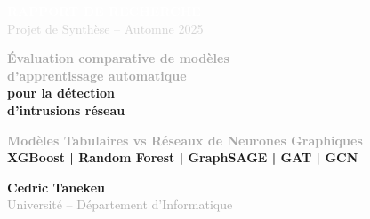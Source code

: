 ﻿\documentclass[11pt,a4paper]{article}
\begin{document}
\onehalfspacing

\begin{titlepage}
\begin{tcolorbox}[
    enhanced,
    colback=white,
    colframe=mainblue,
    boxrule=3pt,
    arc=0mm,
    left=0pt,
    right=0pt,
    top=0pt,
    bottom=0pt,
    height=\textheight,
    valign=center
]

\begin{tcolorbox}[
    colback=mainblue,
    colframe=mainblue,
    arc=0mm,
    boxrule=0pt,
    height=4cm,
    valign=center
]
\begin{center}
    \textcolor{white}{\Large\textbf{RAPPORT DE RECHERCHE}}\\[0.3cm]
    \textcolor{lightgray}{\large Projet de Synthèse -- Automne 2025}
\end{center}
\end{tcolorbox}

\vspace{1.5cm}

\begin{center}
    {\Huge\textbf{\textcolor{darkgray}{Évaluation comparative de modèles}}}\\[0.5cm]
    {\Huge\textbf{\textcolor{darkgray}{d'apprentissage automatique}}}\\[0.5cm]
    {\Huge\textbf{\textcolor{mainblue}{pour la détection}}}\\[0.5cm]
    {\Huge\textbf{\textcolor{mainblue}{d'intrusions réseau}}}
\end{center}

\vspace{1.5cm}

\begin{center}
\begin{tcolorbox}[
    colback=lightgray,
    colframe=accentorange,
    boxrule=2pt,
    arc=3mm,
    width=0.8\textwidth
]
\begin{center}
    \textcolor{darkgray}{\large\textbf{Modèles Tabulaires vs Réseaux de Neurones Graphiques}}\\[0.2cm]
    \textcolor{accentorange}{\textbf{XGBoost | Random Forest | GraphSAGE | GAT | GCN}}
\end{center}
\end{tcolorbox}
\end{center}

\vfill

\begin{center}
\begin{tcolorbox}[
    colback=white,
    colframe=mainblue,
    boxrule=1.5pt,
    arc=3mm,
    width=0.6\textwidth
]
\begin{center}
    {\Large\textbf{\textcolor{mainblue}{Cedric Tanekeu}}}\\[0.3cm]
    \textcolor{darkgray}{Université -- Département d'Informatique}
\end{center}
\end{tcolorbox}
\end{center}


\end{tcolorbox}
\end{titlepage}
\end{document}
